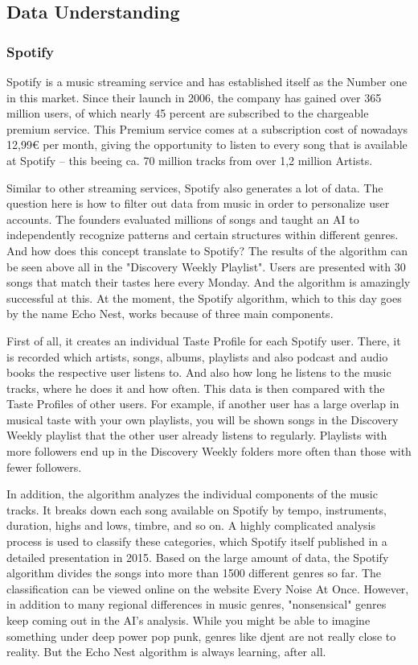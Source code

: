 \subsection{Data Understanding}
\subsubsection{Spotify}
Spotify is a music streaming service and has established itself as the Number one in this market. 
Since their launch in 2006, the company has gained over 365 million users, of which nearly 45 percent are subscribed to the chargeable premium service. 
This Premium service comes at a subscription cost of nowadays 12,99€ per month, giving the opportunity to listen to every song that is available at Spotify – 
this beeing ca. 70 million tracks from over 1,2 million Artists.

Similar to other streaming services, Spotify also generates a lot of data. The question here is how to filter out data from music in order to personalize user accounts. 
The founders evaluated millions of songs and taught an AI to independently recognize patterns and certain structures within different genres. 
And how does this concept translate to Spotify? The results of the algorithm can be seen above all in the "Discovery Weekly Playlist". 
Users are presented with 30 songs that match their tastes here every Monday. And the algorithm is amazingly successful at this. 
At the moment, the Spotify algorithm, which to this day goes by the name Echo Nest, works because of three main components. 

First of all, it creates an individual Taste Profile for each Spotify user. 
There, it is recorded which artists, songs, albums, playlists and also podcast and audio books the respective user listens to. 
And also how long he listens to the music tracks, where he does it and how often. This data is then compared with the Taste Profiles of other users. 
For example, if another user has a large overlap in musical taste with your own playlists, you will be shown songs in the Discovery Weekly playlist 
that the other user already listens to regularly. Playlists with more followers end up in the Discovery Weekly folders more often than those with fewer followers. 

In addition, the algorithm analyzes the individual components of the music tracks. 
It breaks down each song available on Spotify by tempo, instruments, duration, highs and lows, timbre, and so on. 
A highly complicated analysis process is used to classify these categories, which Spotify itself published in a detailed presentation in 2015. 
Based on the large amount of data, the Spotify algorithm divides the songs into more than 1500 different genres so far. 
The classification can be viewed online on the website Every Noise At Once. However, in addition to many regional differences in music genres, 
"nonsensical" genres keep coming out in the AI's analysis. While you might be able to imagine something under deep power pop punk, genres like djent are not really close to reality. 
But the Echo Nest algorithm is always learning, after all. 

